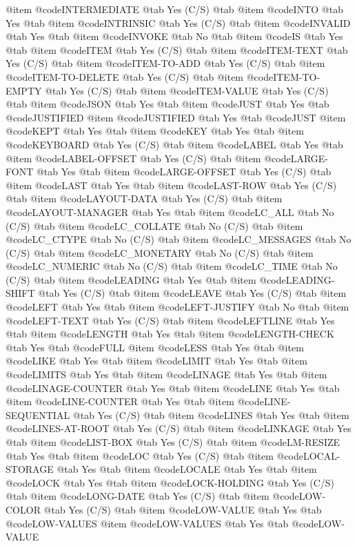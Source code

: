 @item @code{INTERMEDIATE} @tab Yes	(C/S) @tab
@item @code{INTO} @tab Yes @tab
@item @code{INTRINSIC} @tab Yes	(C/S) @tab
@item @code{INVALID} @tab Yes @tab
@item @code{INVOKE} @tab No @tab
@item @code{IS} @tab Yes @tab
@item @code{ITEM} @tab Yes	(C/S) @tab
@item @code{ITEM-TEXT} @tab Yes	(C/S) @tab
@item @code{ITEM-TO-ADD} @tab Yes	(C/S) @tab
@item @code{ITEM-TO-DELETE} @tab Yes	(C/S) @tab
@item @code{ITEM-TO-EMPTY} @tab Yes	(C/S) @tab
@item @code{ITEM-VALUE} @tab Yes	(C/S) @tab
@item @code{JSON} @tab Yes @tab
@item @code{JUST} @tab Yes @tab @code{JUSTIFIED}
@item @code{JUSTIFIED} @tab Yes @tab @code{JUST}
@item @code{KEPT} @tab Yes @tab
@item @code{KEY} @tab Yes @tab
@item @code{KEYBOARD} @tab Yes	(C/S) @tab
@item @code{LABEL} @tab Yes @tab
@item @code{LABEL-OFFSET} @tab Yes	(C/S) @tab
@item @code{LARGE-FONT} @tab Yes @tab
@item @code{LARGE-OFFSET} @tab Yes	(C/S) @tab
@item @code{LAST} @tab Yes @tab
@item @code{LAST-ROW} @tab Yes	(C/S) @tab
@item @code{LAYOUT-DATA} @tab Yes	(C/S) @tab
@item @code{LAYOUT-MANAGER} @tab Yes @tab
@item @code{LC_ALL} @tab No	(C/S) @tab
@item @code{LC_COLLATE} @tab No	(C/S) @tab
@item @code{LC_CTYPE} @tab No	(C/S) @tab
@item @code{LC_MESSAGES} @tab No	(C/S) @tab
@item @code{LC_MONETARY} @tab No	(C/S) @tab
@item @code{LC_NUMERIC} @tab No	(C/S) @tab
@item @code{LC_TIME} @tab No	(C/S) @tab
@item @code{LEADING} @tab Yes @tab
@item @code{LEADING-SHIFT} @tab Yes	(C/S) @tab
@item @code{LEAVE} @tab Yes (C/S) @tab
@item @code{LEFT} @tab Yes @tab
@item @code{LEFT-JUSTIFY} @tab No @tab
@item @code{LEFT-TEXT} @tab Yes	(C/S) @tab
@item @code{LEFTLINE} @tab Yes @tab
@item @code{LENGTH} @tab Yes @tab
@item @code{LENGTH-CHECK} @tab Yes @tab @code{FULL}
@item @code{LESS} @tab Yes @tab
@item @code{LIKE} @tab Yes @tab
@item @code{LIMIT} @tab Yes @tab
@item @code{LIMITS} @tab Yes @tab
@item @code{LINAGE} @tab Yes @tab
@item @code{LINAGE-COUNTER} @tab Yes @tab
@item @code{LINE} @tab Yes @tab
@item @code{LINE-COUNTER} @tab Yes @tab
@item @code{LINE-SEQUENTIAL} @tab Yes	(C/S) @tab
@item @code{LINES} @tab Yes @tab
@item @code{LINES-AT-ROOT} @tab Yes	(C/S) @tab
@item @code{LINKAGE} @tab Yes @tab
@item @code{LIST-BOX} @tab Yes	(C/S) @tab
@item @code{LM-RESIZE} @tab Yes @tab
@item @code{LOC} @tab Yes	(C/S) @tab
@item @code{LOCAL-STORAGE} @tab Yes @tab
@item @code{LOCALE} @tab Yes @tab
@item @code{LOCK} @tab Yes @tab
@item @code{LOCK-HOLDING}  @tab Yes (C/S) @tab
@item @code{LONG-DATE} @tab Yes	(C/S) @tab
@item @code{LOW-COLOR} @tab Yes	(C/S) @tab
@item @code{LOW-VALUE} @tab Yes @tab @code{LOW-VALUES}
@item @code{LOW-VALUES} @tab Yes @tab @code{LOW-VALUE}
